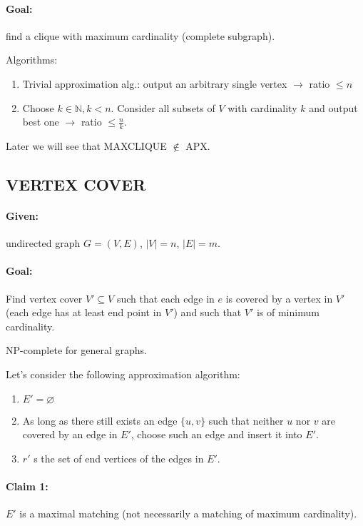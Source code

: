 \documentclass[11pt]{article}
\theoremstyle{definition}
\theoremstyle{definition}
\begin{document}
\paragraph{Goal:} find a clique with maximum cardinality (complete subgraph). \medskip

Algorithms:
\begin{enumerate}
\item Trivial approximation alg.: output an arbitrary single vertex $ \rightarrow $ ratio $ \leq n $
\item Choose $ k \in \mathbb{N} , k < n $. Consider all subsets of $ V $ with cardinality $ k $ and output best one $ \rightarrow $ ratio $ \leq \frac{n}{k} $.
\end{enumerate}

Later we will see that MAXCLIQUE $ \not \in $ APX.



\subsection{VERTEX COVER}
\paragraph{Given:} undirected graph $ G = (V, E) $, $ |V| = n $, $ |E| = m $.

\paragraph{Goal:} Find vertex cover $ V' \subseteq V $ such that each edge in $ e $ is covered by a vertex in $ V' $ (each edge has at least end point in $ V' $) and such that $ V' $ is of minimum cardinality.

NP-complete for general graphs. \medskip

Let's consider the following approximation algorithm:
\begin{enumerate}
\item $ E' = \varnothing $
\item As long as there still exists an edge $ \{u, v\} $ such that neither $ u $ nor $ v $ are covered by an edge in $ E' $, choose such an edge and insert it into $ E' $.
\item $ r' $ s the set of end vertices of the edges in $ E' $.
\end{enumerate}

\paragraph{Claim 1:} $ E' $ is a maximal matching (not necessarily a matching of maximum cardinality).
\end{document}
